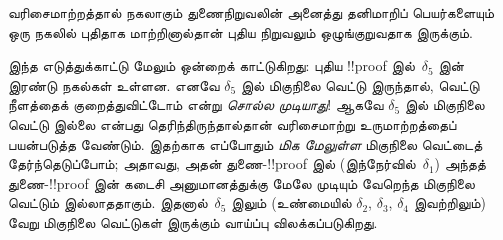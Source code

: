 \documentclass[../../../include/open-logic-section]{subfiles}
\begin{document}
வரிசைமாற்றத்தால் நகலாகும் துணைநிறுவலின் அனைத்து
தனிமாறிப் பெயர்களையும் ஒரு நகலில் புதிதாக மாற்றினால்தான்
புதிய நிறுவலும் ஒழுங்குறுவதாக இருக்கும்.

இந்த எடுத்துக்காட்டு மேலும் ஒன்றைக் காட்டுகிறது:
புதிய !!{proof} இல்~$\delta_5$ இன் இரண்டு
நகல்கள் உள்ளன. எனவே $\delta_5$ இல் மிகுநிலை
வெட்டு இருந்தால், வெட்டு நீளத்தைக் குறைத்துவிட்டோம்
என்று \emph{சொல்ல முடியாது}! ஆகவே $\delta_5$
இல் மிகுநிலை வெட்டு இல்லை என்பது தெரிந்திருந்தால்தான்
வரிசைமாற்று உருமாற்றத்தைப் பயன்படுத்த வேண்டும்.
இதற்காக எப்போதும் \emph{மிக மேலுள்ள} மிகுநிலை
வெட்டைத் தேர்ந்தெடுப்போம்; அதாவது, அதன்
துணை-!!{proof} இல் (இந்நேர்வில்~$\delta_1$)
அந்தத் துணை-!!{proof} இன் கடைசி அனுமானத்துக்கு
மேலே முடியும் வேறெந்த மிகுநிலை வெட்டும்
இல்லாததாகும். இதனால்~$\delta_5$ இலும்
(உண்மையில் $\delta_2$, $\delta_3$, $\delta_4$
இவற்றிலும்) வேறு மிகுநிலை வெட்டுகள் இருக்கும்
வாய்ப்பு விலக்கப்படுகிறது.
\end{document}
